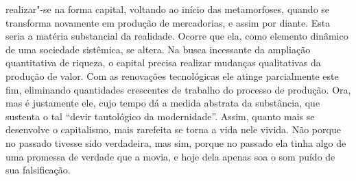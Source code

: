 {realizar"-se na forma capital, voltando ao início das metamorfoses,
quando se transforma novamente em produção de mercadorias, e assim por
diante. Esta seria a matéria substancial da realidade. Ocorre que ela,
como elemento dinâmico de uma sociedade sistêmica, se altera. Na busca
incessante da ampliação quantitativa de riqueza, o capital precisa
realizar mudanças qualitativas da produção de valor. Com as renovações
tecnológicas ele atinge parcialmente este fim, eliminando quantidades
crescentes de trabalho do processo de produção. Ora, mas é justamente
ele, cujo tempo dá a medida abstrata da substância, que sustenta o tal
``devir tautológico da modernidade''. Assim, quanto mais se desenvolve o
capitalismo, mais rarefeita se torna a vida nele vivida. Não porque no
passado tivesse sido verdadeira, mas sim, porque no passado ela tinha
algo de uma promessa de verdade que a movia, e hoje dela apenas soa o
som puído de sua falsificação.

}

